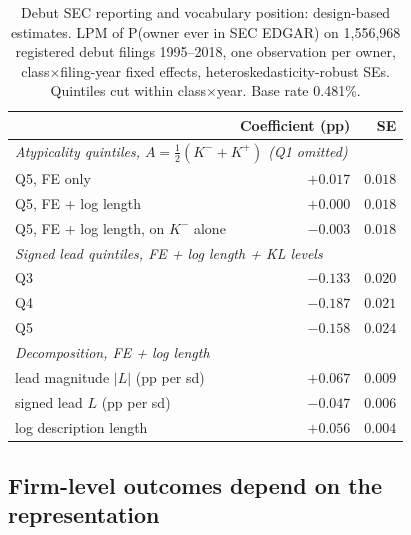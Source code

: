\begin{table}[!htbp]\centering\small
\caption{Debut SEC reporting and vocabulary position: design-based
estimates. LPM of P(owner ever in SEC EDGAR) on 1{,}556{,}968 registered
debut filings 1995--2018, one observation per owner,
class$\times$filing-year fixed effects, heteroskedasticity-robust SEs.
Quintiles cut within class$\times$year. Base rate 0.481\%.}
\label{tab:edgar}
\begin{tabular}{lrr}
\toprule
 & Coefficient (pp) & SE \\
\midrule
\multicolumn{3}{l}{\emph{Atypicality quintiles, $A = \tfrac{1}{2}(K^{-}+K^{+})$ (Q1 omitted)}} \\
\quad Q5, FE only & $+0.017$ & $0.018$ \\
\quad Q5, FE + log length & $+0.000$ & $0.018$ \\
\quad Q5, FE + log length, on $K^{-}$ alone & $-0.003$ & $0.018$ \\
\midrule
\multicolumn{3}{l}{\emph{Signed lead quintiles, FE + log length + KL levels}} \\
\quad Q3 & $-0.133$ & $0.020$ \\
\quad Q4 & $-0.187$ & $0.021$ \\
\quad Q5 & $-0.158$ & $0.024$ \\
\midrule
\multicolumn{3}{l}{\emph{Decomposition, FE + log length}} \\
\quad lead magnitude $|L|$ (pp per sd) & $+0.067$ & $0.009$ \\
\quad signed lead $L$ (pp per sd) & $-0.047$ & $0.006$ \\
\quad log description length & $+0.056$ & $0.004$ \\
\bottomrule
\end{tabular}
\end{table}

\subsection{Firm-level outcomes depend on the
representation}\label{sec:hazard}\label{sec:robust_hazard}

